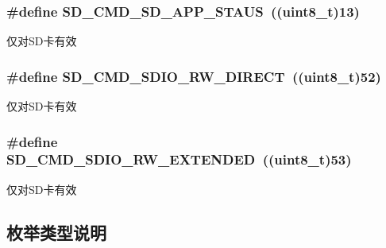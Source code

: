 \subsubsection[{\texorpdfstring{S\+D\+\_\+\+C\+M\+D\+\_\+\+S\+D\+\_\+\+A\+P\+P\+\_\+\+S\+T\+A\+US}{SD_CMD_SD_APP_STAUS}}]{\setlength{\rightskip}{0pt plus 5cm}\#define S\+D\+\_\+\+C\+M\+D\+\_\+\+S\+D\+\_\+\+A\+P\+P\+\_\+\+S\+T\+A\+US~((uint8\+\_\+t)13)}\hypertarget{group__sd__card_ga2984265566ee729869324cf5b842a601}{}\label{group__sd__card_ga2984265566ee729869324cf5b842a601}
仅对\+S\+D卡有效 
\subsubsection[{\texorpdfstring{S\+D\+\_\+\+C\+M\+D\+\_\+\+S\+D\+I\+O\+\_\+\+R\+W\+\_\+\+D\+I\+R\+E\+CT}{SD_CMD_SDIO_RW_DIRECT}}]{\setlength{\rightskip}{0pt plus 5cm}\#define S\+D\+\_\+\+C\+M\+D\+\_\+\+S\+D\+I\+O\+\_\+\+R\+W\+\_\+\+D\+I\+R\+E\+CT~((uint8\+\_\+t)52)}\hypertarget{group__sd__card_ga09d3d2d61d003d6bf75c3fb128e86dbb}{}\label{group__sd__card_ga09d3d2d61d003d6bf75c3fb128e86dbb}
仅对\+S\+D卡有效 
\subsubsection[{\texorpdfstring{S\+D\+\_\+\+C\+M\+D\+\_\+\+S\+D\+I\+O\+\_\+\+R\+W\+\_\+\+E\+X\+T\+E\+N\+D\+ED}{SD_CMD_SDIO_RW_EXTENDED}}]{\setlength{\rightskip}{0pt plus 5cm}\#define S\+D\+\_\+\+C\+M\+D\+\_\+\+S\+D\+I\+O\+\_\+\+R\+W\+\_\+\+E\+X\+T\+E\+N\+D\+ED~((uint8\+\_\+t)53)}\hypertarget{group__sd__card_gaf40f42039cf756a3805800b48e2790ed}{}\label{group__sd__card_gaf40f42039cf756a3805800b48e2790ed}
仅对\+S\+D卡有效 

\subsection{枚举类型说明}
